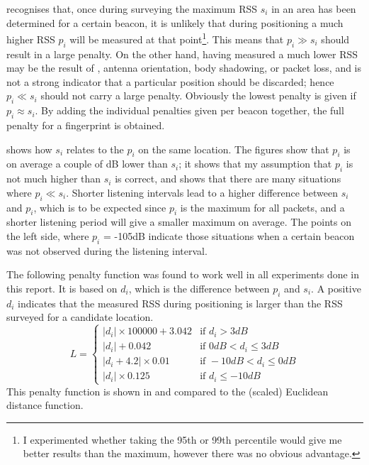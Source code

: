 \BRP recognises that, once during surveying the maximum RSS $s_i$ in an area has been determined for a certain beacon, it is unlikely that during positioning a much higher RSS $p_i$ will be measured at that point\footnote{I experimented whether taking the 95th or 99th percentile would give me better results than the maximum, however there was no obvious advantage.}.
This means that $p_i \gg s_i$ should result in a large penalty.
On the other hand, having measured a much lower RSS may be the result of \mpi, antenna orientation, body shadowing, or packet loss, and is not a strong indicator that a particular position should be discarded; hence $p_i \ll s_i$ should not carry a large penalty.
Obviously the lowest penalty is given if $p_i \approx s_i$.
By adding the individual penalties given per beacon together, the full penalty for a fingerprint is obtained.

 shows how $s_i$ relates to the $p_i$ on the same location.
The figures show that $p_i$ is on average a couple of dB lower than $s_i$; it shows that my assumption that $p_i$ is not much higher than $s_i$ is correct, and shows that there are many situations where $p_i \ll s_i$.
Shorter listening intervals lead to a higher difference between $s_i$ and $p_i$, which is to be expected since $p_i$ is the maximum for all packets, and a shorter listening period will give a smaller maximum on average.
The points on the left side, where $p_i$ = -105dB indicate those situations when a certain beacon was not observed during the listening interval.


The following penalty function was found to work well in all experiments done in this report.
It is based on $d_i$, which is the difference between $p_i$ and $s_i$.
A positive $d_i$ indicates that the measured RSS during positioning is larger than the RSS surveyed for a candidate location.
\begin{equation}
    L = \begin{cases}
        |d_i| \times 100000 +3.042  & \text{if } d_i > 3dB \\
        |d_i| +0.042                & \text{if } 0dB < d_i \leq 3dB \\
        |d_i+4.2| \times 0.01       & \text{if } -10dB < d_i \leq 0dB \\
        |d_i| \times 0.125          & \text{if } d_i \leq -10dB 
    \end{cases}
    \label{eq:architecture-BRP-punishment}
\end{equation}
This penalty function is shown in  and compared to the (scaled) Euclidean distance function.

